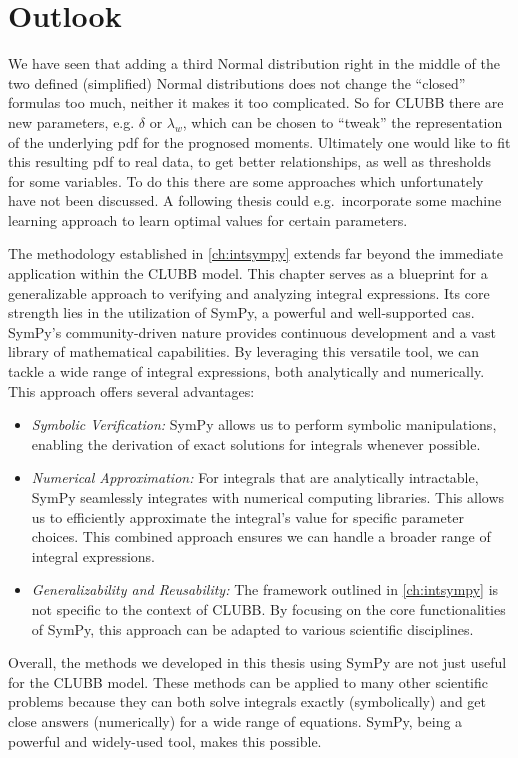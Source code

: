 \chapter{Outlook}\label{ch:outlook}

We have seen that adding a third Normal distribution right in the middle of the two defined (simplified) Normal distributions does not change the \enquote{closed} formulas too much, neither it makes it too complicated.
So for \gls{CLUBB} there are new parameters, e.g. $\delta$ or $\lambda_w$, which can be chosen to \enquote{tweak} the representation of the underlying \gls{pdf} for the prognosed moments.
Ultimately one would like to fit this resulting \gls{pdf} to real data, to get better relationships, as well as thresholds for some variables.
To do this there are some approaches which unfortunately have not been discussed.
A following thesis could e.g.\ incorporate some machine learning approach to learn optimal values for certain parameters.

The methodology established in \autoref{ch:intsympy} extends far beyond the immediate application within the \gls{CLUBB} model.
This chapter serves as a blueprint for a generalizable approach to verifying and analyzing integral expressions.
Its core strength lies in the utilization of SymPy, a powerful and well-supported \gls{cas}.
SymPy's community-driven nature provides continuous development and a vast library of mathematical capabilities.
By leveraging this versatile tool, we can tackle a wide range of integral expressions, both analytically and numerically.
This approach offers several advantages:
\begin{itemize}
    \item \emph{Symbolic Verification:}
    SymPy allows us to perform symbolic manipulations, enabling the derivation of exact solutions for integrals whenever possible.
    \item \emph{Numerical Approximation:}
    For integrals that are analytically intractable, SymPy seamlessly integrates with numerical computing libraries.
    This allows us to efficiently approximate the integral's value for specific parameter choices.
    This combined approach ensures we can handle a broader range of integral expressions.
    \item \emph{Generalizability and Reusability:} The framework outlined in \cref{ch:intsympy} is not specific to the context of \gls{CLUBB}.
    By focusing on the core functionalities of SymPy, this approach can be adapted to various scientific disciplines.
\end{itemize}
Overall, the methods we developed in this thesis using SymPy are not just useful for the \gls{CLUBB} model.
These methods can be applied to many other scientific problems because they can both solve integrals exactly (symbolically) and get close answers (numerically) for a wide range of equations.
SymPy, being a powerful and widely-used tool, makes this possible.